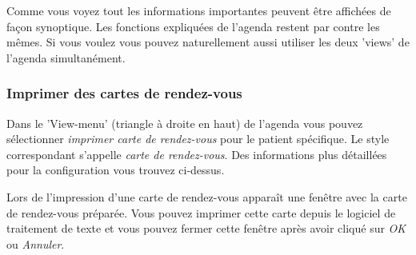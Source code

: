 Comme vous voyez tout les informations importantes peuvent être affichées de façon synoptique. Les fonctions expliquées de l'agenda restent par contre les mêmes. Si vous voulez vous pouvez naturellement aussi utiliser les deux 'views' de l'agenda simultanément.

\subsubsection{Imprimer des cartes de rendez-vous}

Dans le 'View-menu' (triangle à droite en haut) de l'agenda vous pouvez sélectionner \textit{imprimer carte de rendez-vous} pour le patient spécifique. Le style correspondant s'appelle \textit{carte de rendez-vous}.
Des informations plus détaillées pour la configuration vous trouvez ci-dessus.

Lors de l'impression d'une carte de rendez-vous apparaît une fenêtre avec la carte de rendez-vous préparée. Vous pouvez imprimer cette carte depuis le logiciel de traitement de texte et vous pouvez fermer cette fenêtre après avoir cliqué sur \textit{OK} ou \textit{Annuler}.

